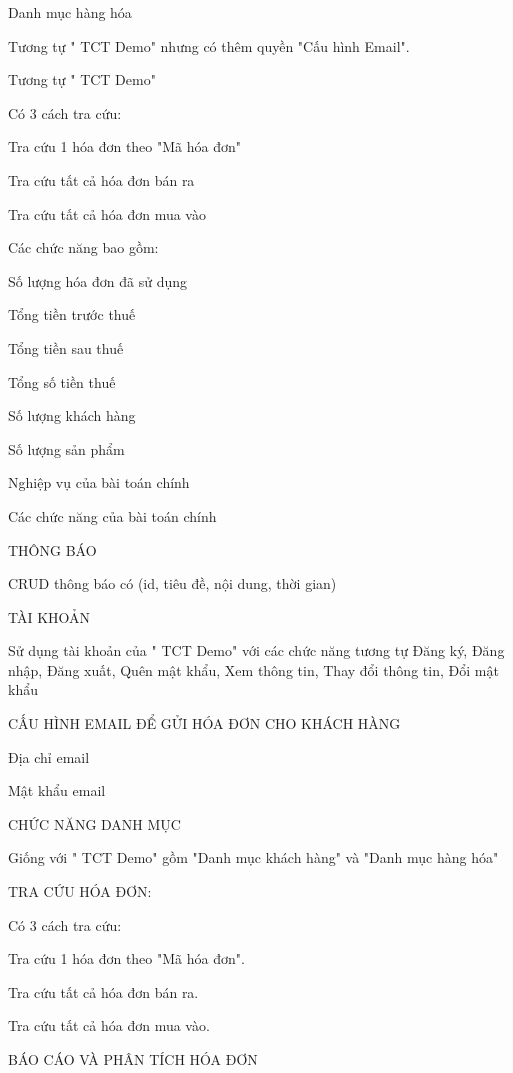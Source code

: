 Danh mục hàng hóa


Tương tự " TCT Demo" nhưng có thêm quyền "Cấu hình Email".


Tương tự " TCT Demo"


Có 3 cách tra cứu:

Tra cứu 1 hóa đơn theo "Mã hóa đơn"

Tra cứu tất cả hóa đơn bán ra

Tra cứu tất cả hóa đơn mua vào


Các chức năng bao gồm:

Số lượng hóa đơn đã sử dụng

Tổng tiền trước thuế

Tổng tiền sau thuế

Tổng số tiền thuế

Số lượng khách hàng

Số lượng sản phẩm


Nghiệp vụ của bài toán chính

Các chức năng của bài toán chính

THÔNG BÁO

CRUD thông báo có (id, tiêu đề, nội dung, thời gian)

TÀI KHOẢN

Sử dụng tài khoản của " TCT Demo" với các chức năng tương tự Đăng ký, Đăng nhập, Đăng xuất, Quên mật khẩu, Xem thông tin, Thay đổi thông tin, Đổi mật khẩu

CẤU HÌNH EMAIL ĐỂ GỬI HÓA ĐƠN CHO KHÁCH HÀNG

Địa chỉ email

Mật khẩu email

CHỨC NĂNG DANH MỤC

Giống với " TCT Demo" gồm "Danh mục khách hàng" và "Danh mục hàng hóa"

TRA CỨU HÓA ĐƠN:

Có 3 cách tra cứu:

Tra cứu 1 hóa đơn theo "Mã hóa đơn".

Tra cứu tất cả hóa đơn bán ra.

Tra cứu tất cả hóa đơn mua vào.

BÁO CÁO VÀ PHÂN TÍCH HÓA ĐƠN

